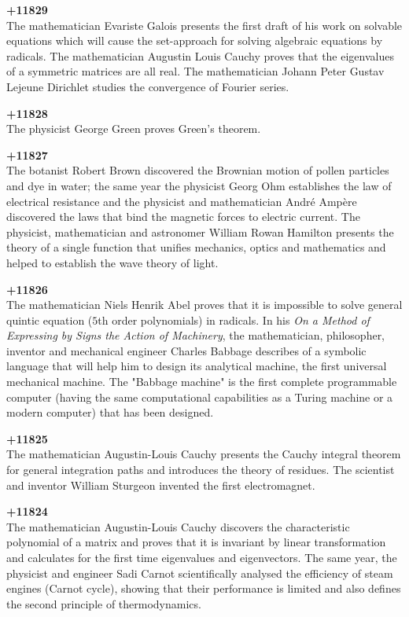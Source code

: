 \textbf{+11829}\\
The mathematician Evariste Galois presents the first draft of his work on solvable equations which will cause the set-approach for solving algebraic equations by radicals. The mathematician Augustin Louis Cauchy proves that the eigenvalues of a symmetric matrices are all real. The mathematician Johann Peter Gustav Lejeune Dirichlet studies the convergence of Fourier series.

\textbf{+11828}\\
The physicist George Green proves Green's theorem.

\textbf{+11827}\\
The botanist Robert Brown discovered the Brownian motion of pollen particles and dye in water; the same year the physicist Georg Ohm establishes the law of electrical resistance and the physicist and mathematician André Ampère discovered the laws that bind the magnetic forces to electric current. The physicist, mathematician and astronomer William Rowan Hamilton presents the theory of a single function that unifies mechanics, optics and mathematics and helped to establish the wave theory of light.

\textbf{+11826}\\
The mathematician Niels Henrik Abel proves that it is impossible to solve general quintic equation ($5$th order polynomials) in radicals. In his \textit{On a Method of Expressing by Signs the Action of Machinery}, the mathematician, philosopher, inventor and mechanical engineer Charles Babbage describes of a symbolic language that will help him to design its analytical machine, the first universal mechanical machine. The "Babbage machine" is the first complete programmable computer (having the same computational capabilities as a Turing machine or a modern computer) that has been designed. 

\textbf{+11825}\\
The mathematician Augustin-Louis Cauchy presents the Cauchy integral theorem for general integration paths and introduces the theory of residues. The scientist and inventor William Sturgeon invented the first electromagnet.

\textbf{+11824}\\
The mathematician Augustin-Louis Cauchy discovers the characteristic polynomial of a matrix and proves that it is invariant by linear transformation and calculates for the first time eigenvalues and eigenvectors. The same year, the physicist and engineer Sadi Carnot scientifically analysed the efficiency of steam engines (Carnot cycle), showing that their performance is limited and also defines the second principle of thermodynamics.

